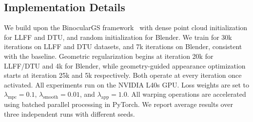 
\subsection{Implementation Details}
We build upon the BinocularGS framework~\cite{han2024binocular} with dense point cloud 
initialization for LLFF and DTU, and random initialization for Blender.
We train for 30k iterations on LLFF and DTU datasets, and 7k iterations on Blender, 
consistent with the baseline.
Geometric regularization begins at iteration 20k for LLFF/DTU and 4k for 
Blender, while geometry-guided appearance optimization starts at iteration 
25k and 5k respectively. Both operate at every iteration once activated.
All experiments run on the NVIDIA L40s GPU.
Loss weights are set to $\lambda_{\text{mpc}} = 0.1$, 
$\lambda_{\text{smooth}} = 0.01$, and $\lambda_{\text{app}} = 1.0$.
All warping operations are accelerated using batched parallel processing in PyTorch.
We report average results over three independent runs with different seeds.


